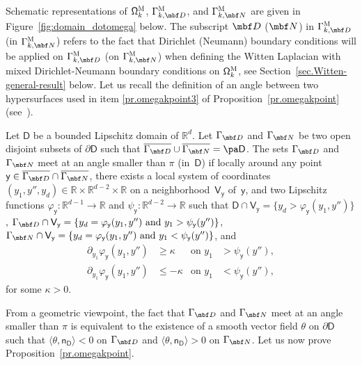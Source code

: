 Schematic representations of $\mathsf \Omega_k^{\textsc{M}}$, $\Gamma_{k,\mbf D}^{\textsc{M}}$, and $\Gamma_{k,\mbf N}^{\textsc{M}}$ are given in Figure~\ref{fig:domain_dotomega} below.
The subscript $\mbf D$ (\resp $\mbf N$) in $\Gamma_{k,\mbf D}^{\textsc{M}}$ (\resp in $\Gamma_{k,\mbf N}^{\textsc{M}}$) refers to the fact that Dirichlet (\resp Neumann) boundary conditions will be applied on $\Gamma_{k,\mbf D}^{\textsc{M}}$ (\resp on $\Gamma_{k,\mbf N}^{\textsc{M}}$) when defining the Witten Laplacian with mixed Dirichlet-Neumann boundary conditions on $\mathsf \Omega_k^{\textsc{M}}$, see Section~\ref{sec.Witten-general-result} below.
Let us recall the definition of an angle between two hypersurfaces used in item \eqref{pr.omegakpoint3} of Proposition~\ref{pr.omegakpoint} (see~\cite{brown-94,jakab-mitrea-mitrea-09}).


\begin{definition}\label{de.angle}
Let $\mathsf D$ be a bounded Lipschitz domain of $\mathbb R^d$. Let $\Gamma_{\mbf D}$
and $\Gamma_{\mbf N}$ be two open disjoint subsets of $\partial \mathsf D$ such that $\overline{\Gamma_{\mbf D}} \cup \overline{\Gamma_{\mbf N}} = \pa
\mathsf D$.
The sets $\Gamma_{\mbf D}$ and~$\Gamma_{\mbf N}$ meet at an angle smaller than
$\pi$ (in~$\mathsf D$) if locally around any point
$\mathsf y \in \overline{\Gamma_{\mbf D}} \cap\nobreak \overline{\Gamma_{\mbf N}}$, there exists a local system of coordinates $(y_1,y'',y_d) \in \mathbb R
\times \mathbb R^{d-2} \times \mathbb R$ on a
neighborhood~$\mathsf V_{\mathsf y}$ of~$\mathsf y$, and two Lipschitz functions
$\varphi_{\mathsf y}:\mathbb R^{d-1} \to \mathbb R$ and $ \psi_{\mathsf y}:\mathbb R^{d-2} \to \mathbb R$ such
that $\mathsf D \cap \mathsf V_{\mathsf y}=\{y_d > \varphi_{\mathsf y}(y_1,y'')\}$, $\Gamma_{\mbf D} \cap
\mathsf V_{\mathsf y}=\{y_d= \varphi_{\mathsf y}(y_1,y'') \text{ and } y_1 > \psi_{\mathsf y}(y'')\}$, \hbox{$\Gamma_{\mbf N} \cap
\mathsf V_{\mathsf y}=\{y_d= \varphi_{\mathsf y}(y_1,y'') \text{ and } y_1 < \psi_{\mathsf y}(y'')\}$}, and
\[
\begin{aligned}
\partial_{y_1} \varphi_{\mathsf y} (y_1,y'') &\ge \kappa &\text{on }
y_1&>\psi_{\mathsf y}(y''),\\
\partial_{y_1} \varphi_{\mathsf y} (y_1,y'') &\le -\kappa &\text{on }
y_1&<\psi_{\mathsf y}(y''),
\end{aligned}
\]
for some $\kappa>0$.
\end{definition}
From a geometric viewpoint, the fact that $\Gamma_{\mbf D}$ and $\Gamma_{\mbf N}$ meet at an angle smaller than
$\pi$ is equivalent to the existence of a
smooth vector field $\theta$ on $\partial \mathsf D$ such that
$\langle \theta, \mathsf n_{\mathsf D} \rangle < 0$ on $\Gamma_{\mbf D}$ and $\langle \theta,
\mathsf n_{\mathsf D}\rangle > 0$ on
$\Gamma_{\mbf N}$.
Let us now prove Proposition~\ref{pr.omegakpoint}.


